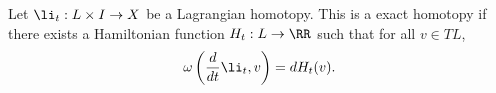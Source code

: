 

    Let $\li_t: L\times I\to X$ be a Lagrangian homotopy. 
    This is a exact homotopy if there exists a Hamiltonian function $H_t:L\to \RR$ such that for all $v\in TL$, 
    \[\omega\left(\frac{d}{dt}\li_t,v\right)=dH_t(v).\]

